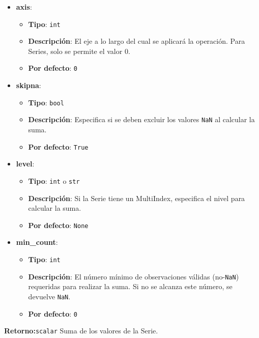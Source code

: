     \begin{itemize}
        \item \textbf{axis}:
            \begin{itemize}
                \item \textbf{Tipo}: \texttt{int}
                \item \textbf{Descripción}: El eje a lo largo del cual se aplicará la operación. Para Series, solo se permite el valor 0.
                \item \textbf{Por defecto}: \texttt{0}
            \end{itemize}

        \item \textbf{skipna}:
            \begin{itemize}
                \item \textbf{Tipo}: \texttt{bool}
                \item \textbf{Descripción}: Especifica si se deben excluir los valores \texttt{NaN} al calcular la suma.
                \item \textbf{Por defecto}: \texttt{True}
            \end{itemize}

        \item \textbf{level}:
            \begin{itemize}
                \item \textbf{Tipo}: \texttt{int} o \texttt{str}
                \item \textbf{Descripción}: Si la Serie tiene un MultiIndex, especifica el nivel para calcular la suma.
                \item \textbf{Por defecto}: \texttt{None}
            \end{itemize}

        \item \textbf{min\_count}:
            \begin{itemize}
                \item \textbf{Tipo}: \texttt{int}
                \item \textbf{Descripción}: El número mínimo de observaciones válidas (no-\texttt{NaN}) requeridas para realizar la suma. Si no se alcanza este número, se devuelve \texttt{NaN}.
                \item \textbf{Por defecto}: \texttt{0}
            \end{itemize}
    \end{itemize}

    \textbf{Retorno:}\texttt{scalar} Suma de los valores de la Serie.

